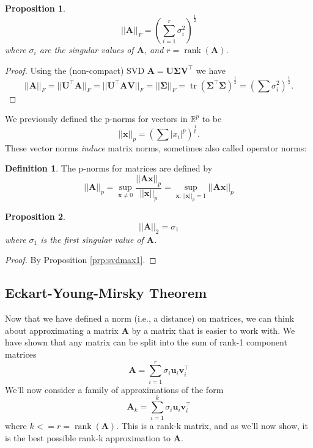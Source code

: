 \documentclass[]{book}
\newtheorem{proposition}{Proposition}[chapter]
\theoremstyle{definition}
\newtheorem{definition}{Definition}[chapter]
\theoremstyle{definition}
\theoremstyle{definition}
\theoremstyle{remark}
\begin{document}
\begin{proposition}
\protect\hypertarget{prp:frob}{}{\label{prp:frob} }\[||\boldsymbol A||_F = \left(\sum_{i=1}^r \sigma_i^2\right)^{\frac{1}{2}}\]
where \(\sigma_i\) are the singular values of \(\boldsymbol A\), and \(r = \operatorname{rank}(\boldsymbol A)\).
\end{proposition}

\begin{proof}
{}Using the (non-compact) SVD
\(\boldsymbol A= \boldsymbol U\boldsymbol \Sigma\boldsymbol V^\top\)
we have \[||\boldsymbol A||_F=||\boldsymbol U^\top \boldsymbol A||_F = ||\boldsymbol U^\top \boldsymbol A\boldsymbol V||_F = ||\boldsymbol \Sigma||_F=\operatorname{tr}(\boldsymbol \Sigma^\top\boldsymbol \Sigma)^\frac{1}{2}=\left(\sum \sigma_i^2 \right)^\frac{1}{2}.\]
\end{proof}

We previously defined the p-norms for vectors in \(\mathbb{R}^p\) to be
\[||\boldsymbol x||_p = \left(\sum |x_i|^p\right)^{\frac{1}{p}}.\]
These vector norms \emph{induce} matrix norms, sometimes also called operator norms:
\begin{definition}
\protect\hypertarget{def:matrixnorm}{}{\label{def:matrixnorm} }The p-norms for matrices are defined by
\[||\boldsymbol A||_p = \sup_{\boldsymbol x\not=0} \frac{||\boldsymbol A\boldsymbol x||_p}{||\boldsymbol x||_p} = \sup_{\boldsymbol x: ||\boldsymbol x||_p=1} ||\boldsymbol A\boldsymbol x||_p\]
\end{definition}

\begin{proposition}
\protect\hypertarget{prp:L2matrixnorm}{}{\label{prp:L2matrixnorm} }\[||\boldsymbol A||_2 = \sigma_1\]
where \(\sigma_1\) is the first singular value of \(\boldsymbol A\).
\end{proposition}
\begin{proof}
{}By Proposition \ref{prp:svdmax1}.
\end{proof}

\hypertarget{eckart-young-mirsky-theorem}{%
\subsection{Eckart-Young-Mirsky Theorem}\label{eckart-young-mirsky-theorem}}

Now that we have defined a norm (i.e., a distance) on matrices, we can think about approximating a matrix \(\boldsymbol A\) by a matrix that is easier to work with. We have shown that any matrix can be split into the sum of rank-1 component matrices
\[\boldsymbol A= \sum_{i=1}^r \sigma_i \boldsymbol u_i \boldsymbol v_i^\top\]
We'll now consider a family of approximations of the form
\begin{equation}
\boldsymbol A_k = \sum_{i=1}^k \sigma_i \boldsymbol u_i \boldsymbol v_i^\top
\label{eq:svdreduced}
\end{equation}
where \(k<=r=\operatorname{rank}(\boldsymbol A)\). This is a rank-k matrix, and as we'll now show, it is the best possible rank-k approximation to \(\boldsymbol A\).
\end{document}
